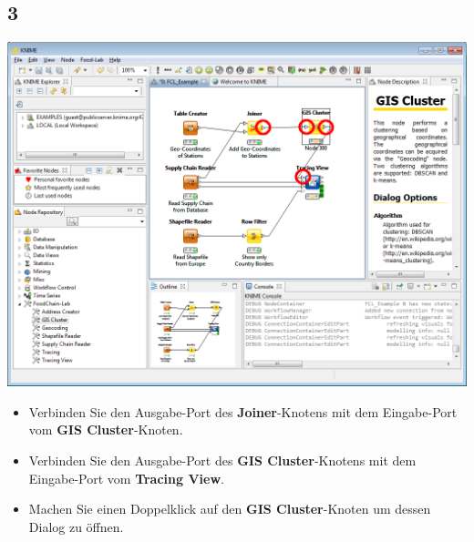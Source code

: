 \documentclass{beamer}
\begin{document}
\subsection{3}
\begin{frame}
	\begin{center}
  		\includegraphics[height=0.6\textheight]{3.png}
	\end{center}
	\begin{itemize}
		\item Verbinden Sie den Ausgabe-Port des \textbf{Joiner}-Knotens mit dem Eingabe-Port vom \textbf{GIS Cluster}-Knoten.
		\item Verbinden Sie den Ausgabe-Port des \textbf{GIS Cluster}-Knotens mit dem Eingabe-Port vom \textbf{Tracing View}.
		\item Machen Sie einen Doppelklick auf den \textbf{GIS Cluster}-Knoten um dessen Dialog zu öffnen.
	\end{itemize}
\end{frame}
\end{document}
